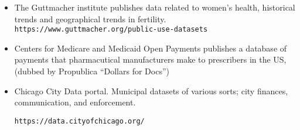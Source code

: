 \documentclass[]{book}
\theoremstyle{definition}
\newtheorem*{soln}{Solution}
\begin{document}
\begin{enumerate}
\begin{itemize}
\item The Guttmacher institute publishes data related to women's health,  historical trends and geographical trends in fertility.
\texttt{https://www.guttmacher.org/public-use-datasets}

\item Centers for Medicare and Medicaid Open Payments publishes a database of payments that pharmacutical manufacturers make to prescribers in the US, (dubbed by Propublica ``Dollars for Docs'')


\item Chicago City Data portal.  Municipal datasets of various sorts; city finances, communication, and enforcement.

\texttt{https://data.cityofchicago.org/}

\end{itemize}


\end{enumerate}
\end{document}
